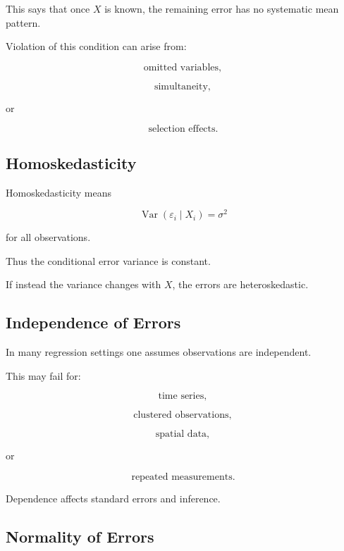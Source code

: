 This says that once \(X\) is known, the remaining error has no systematic
mean pattern.

Violation of this condition can arise from:

\[
\boxed{
\text{omitted variables},
}
\]

\[
\boxed{
\text{simultaneity},
}
\]

or

\[
\boxed{
\text{selection effects}.
}
\]

\subsection{Homoskedasticity}
\label{subsec:homoskedasticity}

Homoskedasticity means

\[
\boxed{
\operatorname{Var}
(
\varepsilon_i\mid X_i
)
=
\sigma^2
}
\]

for all observations.

Thus the conditional error variance is constant.

If instead the variance changes with \(X\), the errors are
heteroskedastic.

\subsection{Independence of Errors}
\label{subsec:independence-errors-regression}

In many regression settings one assumes observations are independent.

This may fail for:

\[
\boxed{
\text{time series},
}
\]

\[
\boxed{
\text{clustered observations},
}
\]

\[
\boxed{
\text{spatial data},
}
\]

or

\[
\boxed{
\text{repeated measurements}.
}
\]

Dependence affects standard errors and inference.

\subsection{Normality of Errors}
\label{subsec:normality-errors-regression}

